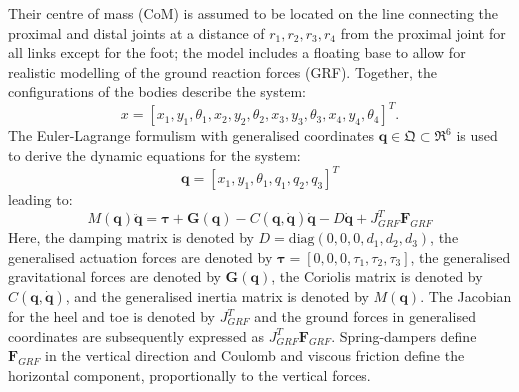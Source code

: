 \documentclass[letterpaper, 10 pt, conference]{ieeeconf}  %
\begin{document}
Their centre of mass (CoM) is assumed to be located on the line connecting the proximal and distal joints at a distance of $r_1,r_2,r_3,r_4$ from the proximal joint for all links except for the foot; the model includes a floating base to allow for realistic modelling of the ground reaction forces (GRF). Together, the configurations of the bodies describe the system:
\begin{equation}
x = [x_1,y_1,\theta_1,x_2,y_2,\theta_2, x_3,y_3,\theta_3,x_4,y_4,\theta_4]^T. 
\end{equation}
The Euler-Lagrange formulism with generalised coordinates $\mathbf{q} \in \mathfrak{Q} \subset \mathfrak{R}^{6}$ is used to derive the dynamic equations for the system:
\begin{equation}
\mathbf{q}=[x_1,y_1,\theta_1,q_1,q_2,q_3]^T \label{eq:q}
\end{equation}
leading to:
\begin{equation}
M(\mathbf{q})\mathbf{\ddot q} = \mathbf{\boldsymbol{\tau} + G(q)} - C\mathbf{(q,\dot q)\dot q -} D \mathbf{\dot q} + J_{GRF}^T \mathbf{F}_{GRF}
\label{eq:fwddyn}
\end{equation}
Here, the damping matrix is denoted by $D = \text{diag} (0,0,0,d_1,d_2,d_3)$, the generalised actuation forces are denoted by $\boldsymbol{\tau} = [0,0,0,\tau_1,\tau_2,\tau_3]$, the generalised gravitational forces are denoted by $\mathbf{G(q)}$, the Coriolis matrix is denoted by $C\mathbf{(q, \dot q)}$, and the generalised inertia matrix is denoted by $M(\mathbf{q})$. The Jacobian for the heel and toe is denoted by $J_{GRF}^T$ and the ground forces in generalised coordinates are subsequently expressed as $J_{GRF}^T \mathbf{F}_{GRF}$. Spring-dampers define $\mathbf{F}_{GRF}$ in the vertical direction and Coulomb and viscous friction define the horizontal component, proportionally to the vertical forces.
\end{document}
